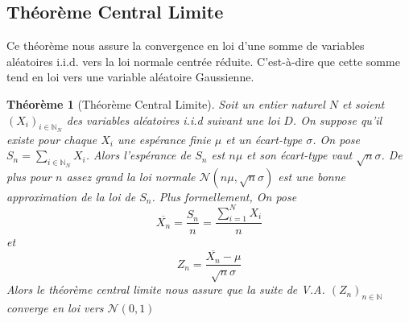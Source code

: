 \documentclass[a4paper]{article}
\newtheorem{theorem}{Théorème}[section]
\begin{document}
\subsection{Théorème Central Limite}
Ce théorème nous assure la convergence en loi d'une somme de variables aléatoires i.i.d. vers la loi normale centrée réduite. C'est-à-dire que cette somme tend en loi vers une variable aléatoire Gaussienne.\\

\begin{theorem}[Théorème Central Limite]
Soit un entier naturel $N$ et soient $(X_i)_{i\in\mathbb{N}_N}$ des variables aléatoires i.i.d suivant une loi $D$. On suppose qu'il existe pour chaque $X_i$ une espérance finie $\mu$ et un écart-type $\sigma$. On pose $S_n = \sum_{i\in\mathbb{N}_N} X_i$. Alors l'espérance de $S_n$ est $n\mu$ et son écart-type vaut $\sqrt{n}\sigma$. De plus pour $n$ assez grand la loi normale $\mathcal{N}(n\mu, \sqrt{n}\sigma)$ est une bonne approximation de la loi de $S_n$.
Plus formellement, On pose
\begin{equation}
    \overline{X_n} = \frac{S_n}{n} = \frac{\sum_{i=1}^{N}X_i} {n}
\end{equation}
et \begin{equation}
    Z_n = \frac{\overline{X_n} - \mu}{\sqrt{n} \sigma}
\end{equation}
Alors le théorème central limite nous assure que la suite de V.A. $(Z_n)_{n\in\mathbb{N}}$ converge en loi vers $\mathcal{N}(0,1)$\\
\end{theorem}
\end{document}
